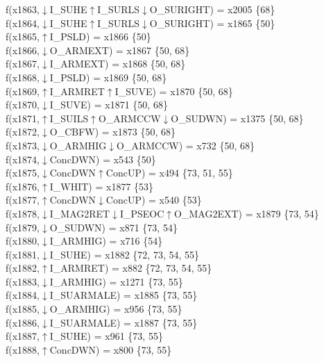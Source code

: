 f(x1863,$\downarrow$I\_SUHE$\uparrow$I\_SURLS$\downarrow$O\_SURIGHT) = x2005 \{68\} \\  
f(x1864,$\downarrow$I\_SUHE$\uparrow$I\_SURLS$\downarrow$O\_SURIGHT) = x1865 \{50\} \\  
f(x1865,$\uparrow$I\_PSLD) = x1866 \{50\} \\  
f(x1866,$\downarrow$O\_ARMEXT) = x1867 \{50, 68\} \\  
f(x1867,$\downarrow$I\_ARMEXT) = x1868 \{50, 68\} \\  
f(x1868,$\downarrow$I\_PSLD) = x1869 \{50, 68\} \\  
f(x1869,$\uparrow$I\_ARMRET$\uparrow$I\_SUVE) = x1870 \{50, 68\} \\  
f(x1870,$\downarrow$I\_SUVE) = x1871 \{50, 68\} \\  
f(x1871,$\uparrow$I\_SUILS$\uparrow$O\_ARMCCW$\downarrow$O\_SUDWN) = x1375 \{50, 68\} \\  
f(x1872,$\downarrow$O\_CBFW) = x1873 \{50, 68\} \\  
f(x1873,$\downarrow$O\_ARMHIG$\downarrow$O\_ARMCCW) = x732 \{50, 68\} \\  
f(x1874,$\downarrow$ConcDWN) = x543 \{50\} \\  
f(x1875,$\downarrow$ConcDWN$\uparrow$ConcUP) = x494 \{73, 51, 55\} \\  
f(x1876,$\uparrow$I\_WHIT) = x1877 \{53\} \\  
f(x1877,$\uparrow$ConcDWN$\downarrow$ConcUP) = x540 \{53\} \\  
f(x1878,$\downarrow$I\_MAG2RET$\downarrow$I\_PSEOC$\uparrow$O\_MAG2EXT) = x1879 \{73, 54\} \\  
f(x1879,$\downarrow$O\_SUDWN) = x871 \{73, 54\} \\  
f(x1880,$\downarrow$I\_ARMHIG) = x716 \{54\} \\  
f(x1881,$\downarrow$I\_SUHE) = x1882 \{72, 73, 54, 55\} \\  
f(x1882,$\uparrow$I\_ARMRET) = x882 \{72, 73, 54, 55\} \\  
f(x1883,$\downarrow$I\_ARMHIG) = x1271 \{73, 55\} \\  
f(x1884,$\downarrow$I\_SUARMALE) = x1885 \{73, 55\} \\  
f(x1885,$\downarrow$O\_ARMHIG) = x956 \{73, 55\} \\  
f(x1886,$\downarrow$I\_SUARMALE) = x1887 \{73, 55\} \\  
f(x1887,$\uparrow$I\_SUHE) = x961 \{73, 55\} \\  
f(x1888,$\uparrow$ConcDWN) = x800 \{73, 55\} \\  
